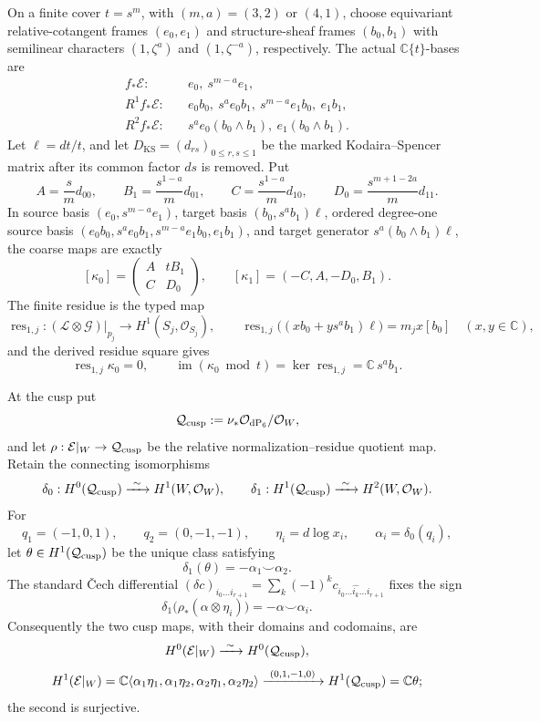 \begin{enumerate}[leftmargin=1.8em]
On a finite cover \(t=s^m\), with \((m,a)=(3,2)\) or \((4,1)\), choose
equivariant relative-cotangent frames \((e_0,e_1)\) and structure-sheaf
frames \((b_0,b_1)\) with semilinear characters
\((1,\zeta^a)\) and \((1,\zeta^{-a})\), respectively.  The actual
\(\mathbb C\{t\}\)-bases are
\[
\begin{aligned}
 f_*\mathcal E:&\quad e_0,\ s^{m-a}e_1,\\
 R^1f_*\mathcal E:&\quad
 e_0b_0,\ s^ae_0b_1,\ s^{m-a}e_1b_0,\ e_1b_1,\\
 R^2f_*\mathcal E:&\quad
 s^ae_0(b_0\wedge b_1),\ e_1(b_0\wedge b_1).
\end{aligned}
\]
Let \(\ell=dt/t\), and let
\(D_{\mathrm{KS}}=(d_{rs})_{0\le r,s\le1}\) be the marked
Kodaira--Spencer matrix after its common factor \(ds\) is removed.  Put
\[
 A=\frac{s}{m}d_{00},\qquad B_1=\frac{s^{1-a}}m d_{01},\qquad
 C=\frac{s^{1-a}}m d_{10},\qquad
 D_0=\frac{s^{m+1-2a}}m d_{11}.
\]
In source basis \((e_0,\allowbreak s^{m-a}e_1)\), target basis
\((b_0,\allowbreak s^ab_1)\ell\), ordered degree-one source basis
\((e_0b_0,\allowbreak s^ae_0b_1,\allowbreak
s^{m-a}e_1b_0,\allowbreak e_1b_1)\), and target generator
\(s^a(b_0\wedge b_1)\ell\), the coarse maps are exactly
\[
 [\kappa_0]=\begin{pmatrix}A&tB_1\\C&D_0\end{pmatrix},\qquad
 [\kappa_1]=(-C,A,-D_0,B_1).
\]
The finite residue is the typed map
\[
 \operatorname{res}_{1,j}:
 (\mathcal L\otimes\mathcal G)|_{p_j}
 \longrightarrow H^1(S_j,\mathcal O_{S_j}),\qquad
 \operatorname{res}_{1,j}\bigl((xb_0+ys^ab_1)\ell\bigr)=m_jx[b_0]
 \quad(x,y\in\mathbb C),
\]
and the derived residue square gives
\[
 \operatorname{res}_{1,j}\kappa_0=0,\qquad
 \operatorname{im}(\kappa_0\bmod t)
 =\ker\operatorname{res}_{1,j}=\mathbb C\,s^ab_1.
\]

At the cusp put
\[
 \mathcal Q_{\rm cusp}:=
 \nu_*\mathcal O_{\mathrm{dP}_6}/\mathcal O_W,
\]
and let
\(\rho:\mathcal E|_W\to\mathcal Q_{\rm cusp}\) be the relative
normalization--residue quotient map.  Retain the connecting isomorphisms
\[
 \delta_0:H^0(\mathcal Q_{\rm cusp})\xrightarrow{\ \sim\ }
 H^1(W,\mathcal O_W),\qquad
 \delta_1:H^1(\mathcal Q_{\rm cusp})\xrightarrow{\ \sim\ }
 H^2(W,\mathcal O_W).
\]
For
\[
 q_1=(-1,0,1),\qquad q_2=(0,-1,-1),\qquad
 \eta_i=d\log x_i,\qquad \alpha_i=\delta_0(q_i),
\]
let \(\theta\in H^1(\mathcal Q_{\rm cusp})\) be the unique class satisfying
\[
 \delta_1(\theta)=-\alpha_1\smile\alpha_2.
\]
The standard
\v Cech differential
\((\delta c)_{i_0\ldots i_{r+1}}
=\sum_k(-1)^kc_{i_0\ldots\widehat{i_k}\ldots i_{r+1}}\)
fixes the sign
\[
 \delta_1\bigl(\rho_*(\alpha\otimes\eta_i)\bigr)
 =-\alpha\smile\alpha_i.
\]
Consequently the two cusp maps, with their domains and codomains, are
\[
 H^0(\mathcal E|_W)\xrightarrow{\ \sim\ }
 H^0(\mathcal Q_{\rm cusp}),
\]
\[
 H^1(\mathcal E|_W)=
 \mathbb C\langle\alpha_1\eta_1,\alpha_1\eta_2,
 \alpha_2\eta_1,\alpha_2\eta_2\rangle
 \xrightarrow{\ (0,1,-1,0)\ }
 H^1(\mathcal Q_{\rm cusp})=\mathbb C\theta;
\]
the second is surjective.


\end{enumerate}
